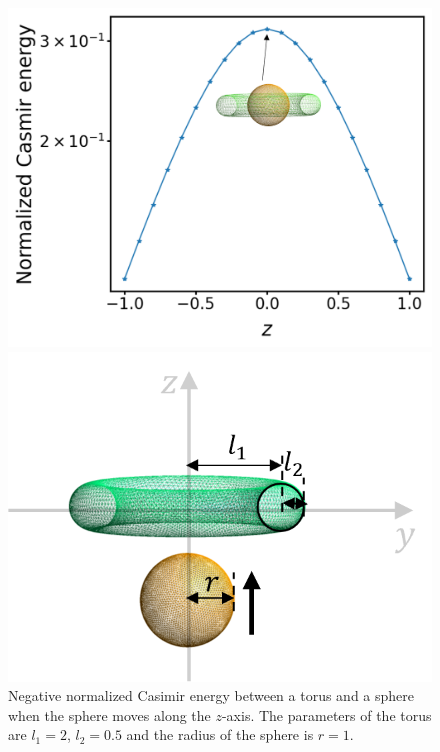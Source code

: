 \begin{figure}[H]
\centering
\begin{minipage}{.65\textwidth}
  \centering
  \includegraphics[width=\textwidth]{figures/Torus_sphere_CasE.png}
\end{minipage}%
\begin{minipage}{.35\textwidth}
  \centering
  \vspace*{-0.6cm}
  \includegraphics[width=\textwidth]{figures/Sphere_torus.png}
\end{minipage}
\caption{Negative normalized Casimir energy between a torus and a sphere when the sphere moves along the $z$-axis. The parameters of the torus are $l_1 = 2$, $l_2 = 0.5$ and the radius of the sphere is $r = 1$.}
\label{fig:Torus_sphere_CasE}
\end{figure}


